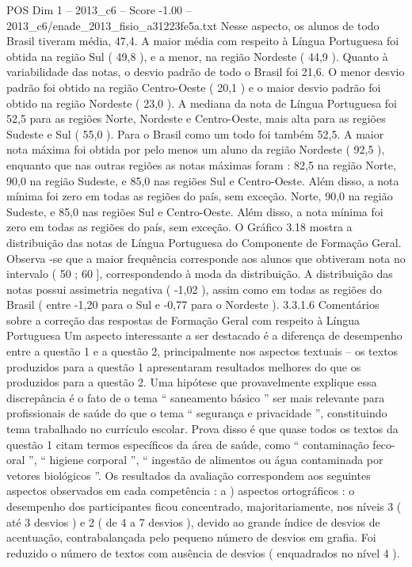 \begin{textsample}{POS Dim 1 – 2013\_c6 – Score -1.00 – 2013\_c6/enade\_2013\_fisio\_a31223fe5a.txt}
Nesse aspecto, os alunos de todo Brasil tiveram média, 47,4.
A maior média com respeito à Língua Portuguesa foi obtida na região Sul ( 49,8 ), e a menor, na região Nordeste ( 44,9 ).
Quanto à variabilidade das notas, o desvio padrão de todo o Brasil foi 21,6.
O menor desvio padrão foi obtido na região Centro-Oeste ( 20,1 ) e o maior desvio padrão foi obtido na região Nordeste ( 23,0 ).
A mediana da nota de Língua Portuguesa foi 52,5 para as regiões Norte, Nordeste e Centro-Oeste, mais alta para as regiões Sudeste e Sul ( 55,0 ).
Para o Brasil como um todo foi também 52,5.
A maior nota máxima foi obtida por pelo menos um aluno da região Nordeste ( 92,5 ), enquanto que nas outras regiões as notas máximas foram : 82,5 na região Norte, 90,0 na região Sudeste, e 85,0 nas regiões Sul e Centro-Oeste.
Além disso, a nota mínima foi zero em todas as regiões do país, sem exceção.
Norte, 90,0 na região Sudeste, e 85,0 nas regiões Sul e Centro-Oeste.
Além disso, a nota mínima foi zero em todas as regiões do país, sem exceção.
O Gráfico 3.18 mostra a distribuição das notas de Língua Portuguesa do Componente de Formação Geral.
Observa -se que a maior frequência corresponde aos alunos que obtiveram nota no intervalo ( 50 ; 60 ], correspondendo à moda da distribuição.
A distribuição das notas possui assimetria negativa ( -1,02 ), assim como em todas as regiões do Brasil ( entre -1,20 para o Sul e -0,77 para o Nordeste ). 3.3.1.6 Comentários sobre a correção das respostas de Formação Geral com respeito à Língua Portuguesa Um aspecto interessante a ser destacado é a diferença de desempenho entre a questão 1 e a questão 2, principalmente nos aspectos textuais – os textos produzidos para a questão 1 apresentaram resultados melhores do que os produzidos para a questão 2.
Uma hipótese que provavelmente explique essa discrepância é o fato de o tema “ saneamento básico ” ser mais relevante para profissionais de saúde do que o tema “ segurança e privacidade ”, constituindo tema trabalhado no currículo escolar.
Prova disso é que quase todos os textos da questão 1 citam termos específicos da área de saúde, como “ contaminação feco-oral ”, “ higiene corporal ”, “ ingestão de alimentos ou água contaminada por vetores biológicos ”.
Os resultados da avaliação correspondem aos seguintes aspectos observados em cada competência : a ) aspectos ortográficos : o desempenho dos participantes ficou concentrado, majoritariamente, nos níveis 3 ( até 3 desvios ) e 2 ( de 4 a 7 desvios ), devido ao grande índice de desvios de acentuação, contrabalançada pelo pequeno número de desvios em grafia.
Foi reduzido o número de textos com ausência de desvios ( enquadrados no nível 4 ).

\end{textsample}
